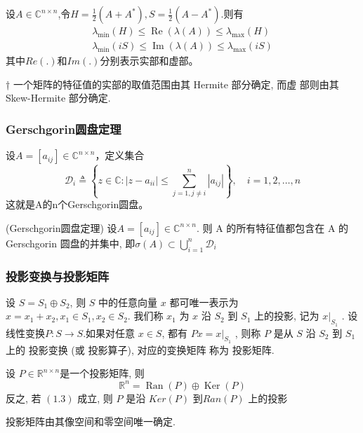 \documentclass[12pt,a4paper]{article}
\begin{document}
设$A \in \mathbb{C}^{n \times n}$,令$H=\frac{1}{2}\left(A+A^{*}\right), S=\frac{1}{2}\left(A-A^{*}\right)$.则有
$$
\begin{array}{l}{\lambda_{\min }(H) \leq \operatorname{Re}(\lambda(A)) \leq \lambda_{\max }(H)} \\ {\lambda_{\min }(i S) \leq \operatorname{Im}(\lambda(A)) \leq \lambda_{\max }(i S)}\end{array}
$$
其中$Re(.)$和$Im(.)$分别表示实部和虚部。


† 一个矩阵的特征值的实部的取值范围由其 Hermite 部分确定, 而虚
部则由其 Skew-Hermite 部分确定.


\subsubsection{Gerschgorin圆盘定理}
设$A=\left[a_{i j}\right] \in \mathbb{C}^{n \times n}$，定义集合
$$
\mathcal{D}_{i} \triangleq\left\{z \in \mathbb{C} :\left|z-a_{i i}\right| \leq \sum_{j=1, j \neq i}^{n}\left|a_{i j}\right|\right\}, \quad i=1,2, \ldots, n
$$
这就是A的n个Gerschgorin圆盘。


\begin{theorem}(Gerschgorin圆盘定理)
	设$A=\left[a_{i j}\right] \in \mathbb{C}^{n \times n}$. 则 A 的所有特征值都包含在 A 的 Gerschgorin 圆盘的并集中, 即$\sigma(A) \subset \bigcup_{i=1}^{n} \mathcal{D}_{i}$
\end{theorem}



\subsubsection{投影变换与投影矩阵}
设 $S = S_1 ⊕ S_2$, 则 $S$ 中的任意向量 $x$ 都可唯一表示为
$x = x_1 + x_2, x_1 ∈ S_1, x_2 ∈ S_2.$
我们称 $x_1$ 为 $x$ 沿 $S_2$ 到 $S_1$ 上的投影, 记为 $x|_{S_1}$
.
设线性变换$ P : S → S. $如果对任意 $x ∈ S$, 都有
$P x = x|_{S_1}$
,
则称 $P$ 是从 $S$ 沿 $S_2$ 到 $S_1$ 上的 投影变换 (或 投影算子), 对应的变换矩阵
称为 投影矩阵.


\begin{lemma}
	设 $P ∈ \mathbb{R}^{n×n} $是一个投影矩阵, 则
	\begin{equation}
	\mathbb{R}^{n}=\operatorname{Ran}(P) \oplus \operatorname{Ker}(P)
	\end{equation}
	反之, 若 $(1.3)$ 成立, 则 $P$ 是沿 $Ker(P)$ 到$ Ran(P)$ 上的投影
\end{lemma}

投影矩阵由其像空间和零空间唯一确定.
\end{document}
